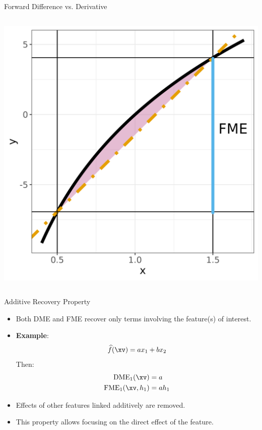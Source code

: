 \documentclass[11pt,compress,t,notes=noshow, aspectratio=169, xcolor=table]{beamer}
\begin{document}
\begin{frame}{Forward Difference vs. Derivative}
\begin{columns}[T]
\begin{column}{0.35\textwidth}
\includegraphics[width=\textwidth]{figure-man/forward_me_deviation.png}
\end{column}
\end{columns}
\end{frame}

\begin{frame}{Additive Recovery Property}
\begin{itemize}
\item Both DME and FME recover only terms involving the feature(s) of interest.
\item \textbf{Example}:
\[
\widehat{f}(\xv) = a x_1 + b x_2
\]
Then:
\begin{align*}
\text{DME}_1(\xv) &= a \\
\text{FME}_1(\xv, h_1) &= a h_1
\end{align*}
\item Effects of other features linked additively are removed.
\item This property allows focusing on the direct effect of the feature.
\end{itemize}
\end{frame}
\end{document}

